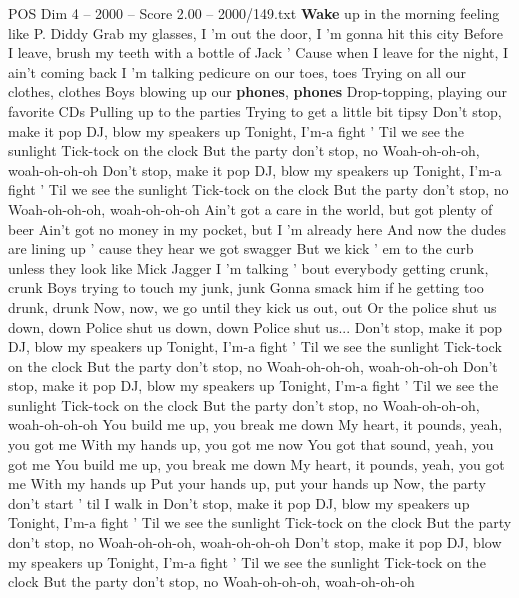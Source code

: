 \begin{textsample}{POS Dim 4 – 2000 – Score 2.00 – 2000/149.txt}  \label{ex:f4_pos_004}
\textbf{Wake} up in the morning feeling like P.
Diddy Grab my glasses, I 'm out the door, I 'm gonna hit this city Before I leave, brush my teeth with a bottle of Jack ' Cause when I leave for the night, I ain't coming back I 'm talking pedicure on our toes, toes Trying on all our clothes, clothes Boys blowing up our \textbf{phones}, \textbf{phones} Drop-topping, playing our favorite CDs Pulling up to the parties Trying to get a little bit tipsy Don't stop, make it pop DJ, blow my speakers up Tonight, I'm-a fight ' Til we see the sunlight Tick-tock on the clock But the party don't stop, no Woah-oh-oh-oh, woah-oh-oh-oh Don't stop, make it pop DJ, blow my speakers up Tonight, I'm-a fight ' Til we see the sunlight Tick-tock on the clock But the party don't stop, no Woah-oh-oh-oh, woah-oh-oh-oh Ain't got a care in the world, but got plenty of beer Ain't got no money in my pocket, but I 'm already here And now the dudes are lining up ' cause they hear we got swagger But we kick ' em to the curb unless they look like Mick Jagger I 'm talking ' bout everybody getting crunk, crunk Boys trying to touch my junk, junk Gonna smack him if he getting too drunk, drunk Now, now, we go until they kick us out, out Or the police shut us down, down Police shut us down, down Police shut us...
Don't stop, make it pop DJ, blow my speakers up Tonight, I'm-a fight ' Til we see the sunlight Tick-tock on the clock But the party don't stop, no Woah-oh-oh-oh, woah-oh-oh-oh Don't stop, make it pop DJ, blow my speakers up Tonight, I'm-a fight ' Til we see the sunlight Tick-tock on the clock But the party don't stop, no Woah-oh-oh-oh, woah-oh-oh-oh You build me up, you break me down My heart, it pounds, yeah, you got me With my hands up, you got me now You got that sound, yeah, you got me You build me up, you break me down My heart, it pounds, yeah, you got me With my hands up Put your hands up, put your hands up Now, the party don't start ' til I walk in Don't stop, make it pop DJ, blow my speakers up Tonight, I'm-a fight ' Til we see the sunlight Tick-tock on the clock But the party don't stop, no Woah-oh-oh-oh, woah-oh-oh-oh Don't stop, make it pop DJ, blow my speakers up Tonight, I'm-a fight ' Til we see the sunlight Tick-tock on the clock But the party don't stop, no Woah-oh-oh-oh, woah-oh-oh-oh

\end{textsample}
